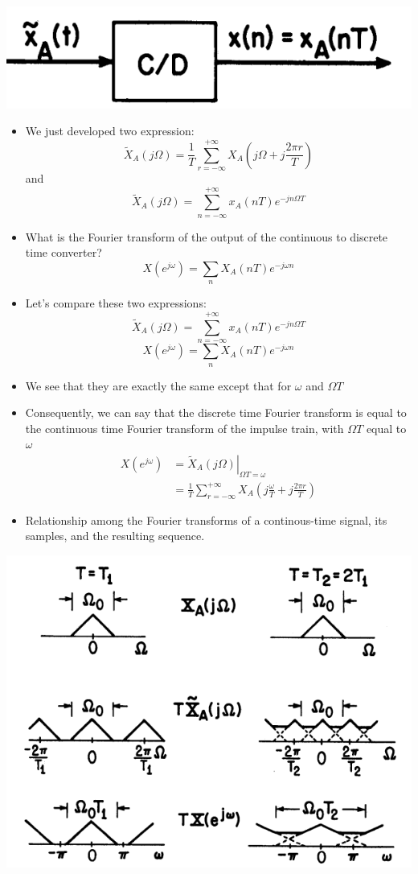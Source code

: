 \documentclass[pdflatex,compress,mathserif]{beamer}
\begin{document}
\begin{frame}
	\begin{center}
		\includegraphics[width=0.4\linewidth]{img/img04}
	\end{center}
	\begin{itemize}
		\item We just developed two expression:
		\[ \tilde{X}_A(j\Omega) = \frac{1}{T} \sum_{r = -\infty}^{+ \infty} X_A \left(j\Omega+j\frac{2 \pi r}{T}\right) \] and 
		\[ \tilde{X}_A(j\Omega) = \sum_{n = - \infty}^{+\infty} x_A(nT)  e^{-jn\Omega T} \]
		\item What is the Fourier transform of the output of the continuous to discrete time converter?
		\[ X(e^{j\omega}) = \sum_n X_A(nT)e^{-j\omega n} \]
	\end{itemize}
\end{frame}

\begin{frame}
	\begin{itemize}
		\item Let's compare these two expressions:
		\[ \tilde{X}_A(j\Omega) = \sum_{n = - \infty}^{+\infty} x_A(nT)  e^{-jn\Omega T} \]
		\[ X(e^{j\omega}) = \sum_n X_A(nT)e^{-j\omega n} \]
		\item We see that they are exactly the same except that for $\omega$ and $\Omega T$
	\end{itemize}
\end{frame}

\begin{frame}
	\begin{itemize}
		\item Consequently, we can say that the discrete time Fourier transform is equal to the continuous time Fourier transform of the impulse train, with $ \Omega T $ equal to $\omega$
		\begin{align*}
			X(e^{j\omega}) &= \left.\tilde{X}_A(j\Omega)\right|_{\Omega T = \omega} \\
			&= \frac{1}{T} \sum_{r = -\infty}^{+ \infty} X_A \left(j\frac{\omega}{T}+j\frac{2 \pi r}{T}\right)
		\end{align*}
		\[  \]
	\end{itemize}
\end{frame}

\begin{frame}
	\begin{itemize}
		\item Relationship among the Fourier transforms of a continous-time signal, its samples, and the resulting sequence.
	\end{itemize}
	\begin{center}
		\includegraphics[width=0.6\linewidth]{img/img02}
	\end{center}
\end{frame}
\end{document}
